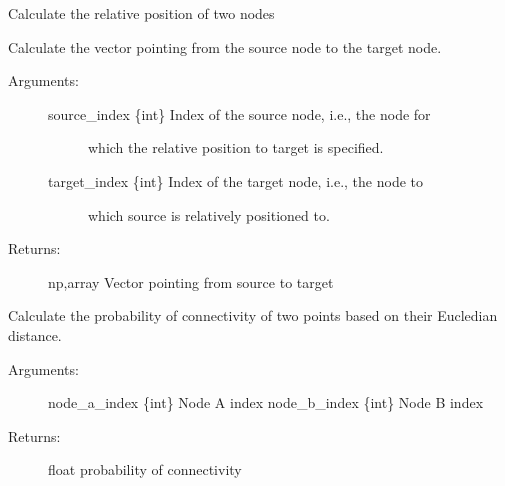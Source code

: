\documentclass[letterpaper,10pt,english]{sphinxmanual}
\begin{document}
\begin{fulllineitems}

\begin{fulllineitems}
\label{\detokenize{index:environment.Environment.get_rel_pos}}
Calculate the relative position of two nodes

Calculate the vector pointing from the source node to the target node.
\begin{description}
\item[{Arguments:}] \leavevmode\begin{description}
\item[{source\_index \{int\} \textendash{} Index of the source node, i.e., the node for}] \leavevmode
which the relative position to target is specified.

\item[{target\_index \{int\} \textendash{} Index of the target node, i.e., the node to}] \leavevmode
which source is relatively positioned to.

\end{description}

\item[{Returns:}] \leavevmode
np,array \textendash{} Vector pointing from source to target

\end{description}

\end{fulllineitems}


\begin{fulllineitems}
\label{\detokenize{index:environment.Environment.prob}}
Calculate the probability of connectivity of two points based on
their Eucledian distance.
\begin{description}
\item[{Arguments:}] \leavevmode
node\_a\_index \{int\} \textendash{} Node A index
node\_b\_index \{int\} \textendash{} Node B index

\item[{Returns:}] \leavevmode
float \textendash{} probability of connectivity


\end{description}
\end{fulllineitems}
\end{fulllineitems}
\end{document}
